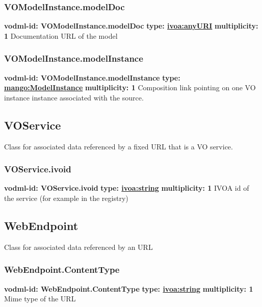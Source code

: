     \subsubsection{VOModelInstance.modelDoc}
      \textbf{vodml-id: VOModelInstance.modelDoc} \newline
      \textbf{type: \hyperref[sect:ivoa]{ivoa:anyURI}} \newline
      \textbf{multiplicity: 1} \newline 
      Documentation URL of the model

    \subsubsection{VOModelInstance.modelInstance}
      \textbf{vodml-id: VOModelInstance.modelInstance} \newline
      \textbf{type: \hyperref[sect:ModelInstance]{mango:ModelInstance}} \newline
      \textbf{multiplicity: 1} \newline 
      Composition link pointing on one VO instance instance associated with the source.

  \subsection{VOService}
  \label{sect:VOService}
    Class for associated data referenced by a fixed URL that is a VO service.

    \subsubsection{VOService.ivoid}
      \textbf{vodml-id: VOService.ivoid} \newline
      \textbf{type: \hyperref[sect:ivoa]{ivoa:string}} \newline
      \textbf{multiplicity: 1} \newline 
      IVOA id of the service (for example in the registry)

  \subsection{WebEndpoint}
  \label{sect:WebEndpoint}
    Class for associated data referenced by an URL

    \subsubsection{WebEndpoint.ContentType}
      \textbf{vodml-id: WebEndpoint.ContentType} \newline
      \textbf{type: \hyperref[sect:ivoa]{ivoa:string}} \newline
      \textbf{multiplicity: 1} \newline 
      Mime type of the URL


